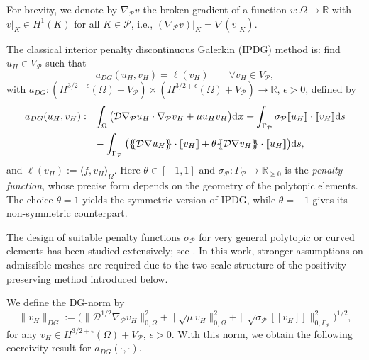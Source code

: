\documentclass[11pt,final]{amsart}
\theoremstyle{plain}
\theoremstyle{definition}
\newcommand\calP{{\mathcal{P}}}
\newcommand{\mean}[1]{\{\kern-1.1mm\{#1\}\kern-1.1mm\}}
\newcommand{\jump}[1]{[\![#1]\!]}                        %
\begin{document}
For brevity, we denote by $\nabla_{\calP} v$ the broken gradient of a
function $v:\Omega\to\mathbb{R}$ with $v|_K \in H^1(K)$ for all $K \in
\calP$, i.e., $(\nabla_{\calP} v)|_K = \nabla(v|_K)$.

The classical interior penalty discontinuous Galerkin (IPDG) method
is: find $u_H \in V_\calP$ such that
\begin{equation}\label{wip}
  a_{DG}(u_H,v_H) = \ell(v_H) 
  \qquad \forall v_H \in V_\calP,
\end{equation}
with $a_{DG}: (H^{3/2+\epsilon}(\Omega) + V_\calP)\times
(H^{3/2+\epsilon}(\Omega) + V_\calP)\to\mathbb{R}$, $\epsilon>0$, defined by
\begin{equation}\label{IPDG}
\begin{aligned}
a_{DG}(u_H,v_H) := & 
 \int_\Omega \big(\mathcal{D}\nabla_{\calP} u_H \cdot \nabla_{\calP} v_H + \mu u_H v_H\big)  \mathrm{d}\boldsymbol{x} 
 + \int_{\Gamma_\calP} \sigma_\calP \jump{u_H}\cdot \jump{v_H}  \mathrm{d}s \\
& - \int_{\Gamma_\calP} \big( \mean{\mathcal{D}\nabla u_H}\cdot \jump{v_H} 
  + \theta  \mean{\mathcal{D}\nabla v_H}\cdot \jump{u_H} \big)  \mathrm{d}s,
\end{aligned}
\end{equation}
and $\ell(v_H) := \langle f, v_H \rangle_{\Omega}$. Here $\theta \in
[-1,1]$ and $\sigma_\calP:\Gamma_\calP \to \mathbb{R}_{\ge 0}$ is the
\emph{penalty function}, whose precise form depends on the geometry of
the polytopic elements. The choice $\theta=1$ yields the symmetric
version of IPDG, while $\theta=-1$ gives its non-symmetric
counterpart.

The design of suitable penalty functions $\sigma_\calP$ for very
general polytopic or curved elements has been studied extensively; see
\cite{cangiani2014hp,cangiani2017hp,prismatic,DG-EASE,RIPDG}. In this
work, stronger assumptions on admissible meshes are required due to
the two-scale structure of the positivity-preserving method introduced
below.
 
We define the DG-norm by
\[
  \| v_H \|_{DG} := 
  \Big(
    \| \mathcal{D}^{1/2} \nabla_{\calP} v_H \|_{0,\Omega}^2
    + \| \sqrt{\mu}  v_H \|_{0,\Omega}^2
    + \| \sqrt{\sigma_\calP} \jump{v_H} \|_{0,\Gamma_{\calP}}^2
  \Big)^{1/2},
\]
for any $v_H \in H^{3/2+\epsilon}(\Omega) + V_\calP$, $\epsilon > 0$.  
With this norm, we obtain the following coercivity result for $a_{DG}(\cdot,\cdot)$.
\end{document}
